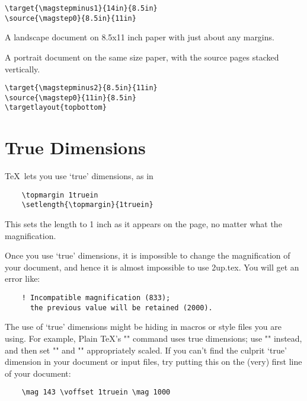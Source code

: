 \documentclass[12pt]{article}
\newcommand\namelistlabel[1]{\mbox{\bf #1}\hfil}
\newenvironment{namelist}[1]%
  {\begin{list}{}%
    {\let\makelabel\namelistlabel
    \settowidth{\labelwidth}{#1}
    \setlength{\leftmargin}{1.1\labelwidth}}}%
 {\end{list}}
\begin{document}
\begin{description}
\begin{namelist}{Sourcexxx}
\item [Definition:]\hspace{1pt}
\begin{verbatim}
\target{\magstepminus1}{14in}{8.5in}
\source{\magstep0}{8.5in}{11in}
\end{verbatim}
\end{namelist}

\item [$\setminus$twouplandscape]\hspace{1pt}
\begin{namelist}{Sourcexxx}

\item [Source:] A landscape document on 8.5x11 inch paper with just about any
margins.

\item [Target:] A portrait document on the same size paper, with the
source pages stacked vertically.

\item [Definition:]\hspace{1pt}
\begin{verbatim}
\target{\magstepminus2}{8.5in}{11in}
\source{\magstep0}{11in}{8.5in}
\targetlayout{topbottom}
\end{verbatim}
\end{namelist}

\end{description}


\section{True Dimensions}

\TeX\ lets you use `true' dimensions, as in
\begin{verbatim}
    \topmargin 1truein
    \setlength{\topmargin}{1truein}
\end{verbatim}
This sets the length to 1 inch
as it appears on the page, no matter what the magnification.

Once you use `true' dimensions, it is impossible to change the
magnification of your document, and hence it is almost impossible
to use 2up.tex. You will get an error like:
\begin{verbatim}
    ! Incompatible magnification (833);
      the previous value will be retained (2000).
\end{verbatim}%

The use of `true' dimensions might be hiding in macros or style files
you are using. For example, Plain \TeX's "\magnification" command uses
true dimensions; use "\mag" instead, and then set "\hsize" and
"\vsize" appropriately scaled. If you can't find the culprit `true'
dimension in your document or input files, try putting this on the
(very) first line of your document:
\begin{verbatim}
    \mag 143 \voffset 1truein \mag 1000
\end{verbatim}
\end{document}

